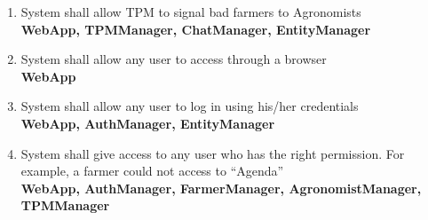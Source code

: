 \begin{enumerate} [label=\textbf{R.\arabic*}]
    \item System shall allow TPM to signal bad farmers to Agronomists\\
        \textbf{WebApp, TPMManager, ChatManager, EntityManager}
    \item System shall allow any user to access through a browser\\
        \textbf{WebApp}
    \item System shall allow any user to log in using his/her credentials\\
        \textbf{WebApp, AuthManager, EntityManager}
    \item System shall give access to any user who has the right permission. For example, a farmer could not access to “Agenda”\\
        \textbf{WebApp, AuthManager, FarmerManager, AgronomistManager, TPMManager}
\end{enumerate}
